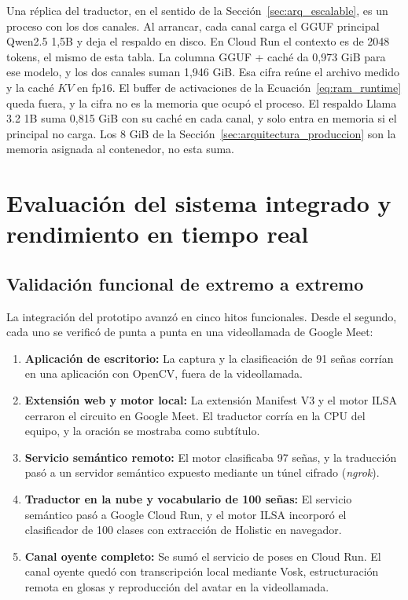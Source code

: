 Una réplica del traductor, en el sentido de la Sección~\ref{sec:arq_escalable}, es un proceso con los dos canales. Al arrancar, cada canal carga el GGUF principal Qwen2.5 1,5B y deja el respaldo en disco. En Cloud Run el contexto es de 2048 tokens, el mismo de esta tabla. La columna GGUF + caché da 0,973 GiB para ese modelo, y los dos canales suman 1,946 GiB. Esa cifra reúne el archivo medido y la caché \(KV\) en fp16. El buffer de activaciones de la Ecuación~\ref{eq:ram_runtime} queda fuera, y la cifra no es la memoria que ocupó el proceso. El respaldo Llama 3.2 1B suma 0,815 GiB con su caché en cada canal, y solo entra en memoria si el principal no carga. Los 8 GiB de la Sección~\ref{sec:arquitectura_produccion} son la memoria asignada al contenedor, no esta suma.

\section{Evaluación del sistema integrado y rendimiento en tiempo real}

\subsection{Validación funcional de extremo a extremo}
La integración del prototipo avanzó en cinco hitos funcionales. Desde el segundo, cada uno se verificó de punta a punta en una videollamada de Google Meet:
\begin{enumerate}
    \item \textbf{Aplicación de escritorio:} La captura y la clasificación de 91 señas corrían en una aplicación con OpenCV, fuera de la videollamada.
    \item \textbf{Extensión web y motor local:} La extensión Manifest V3 y el motor ILSA cerraron el circuito en Google Meet. El traductor corría en la CPU del equipo, y la oración se mostraba como subtítulo.
    \item \textbf{Servicio semántico remoto:} El motor clasificaba 97 señas, y la traducción pasó a un servidor semántico expuesto mediante un túnel cifrado (\textit{ngrok}).
    \item \textbf{Traductor en la nube y vocabulario de 100 señas:} El servicio semántico pasó a Google Cloud Run, y el motor ILSA incorporó el clasificador de 100 clases con extracción de Holistic en navegador.
    \item \textbf{Canal oyente completo:} Se sumó el servicio de poses en Cloud Run. El canal oyente quedó con transcripción local mediante Vosk, estructuración remota en glosas y reproducción del avatar en la videollamada.
\end{enumerate}

